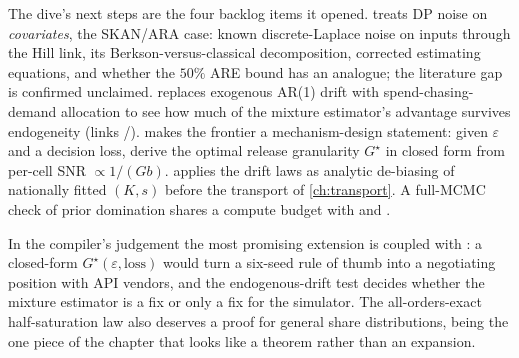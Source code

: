 The dive's next steps are the four backlog items it opened.  treats DP noise on \emph{covariates}, the SKAN/ARA case: known discrete-Laplace noise on inputs through the Hill link, its Berkson-versus-classical decomposition, corrected estimating equations, and whether the $50\%$ ARE bound has an analogue; the literature gap is confirmed unclaimed.  replaces exogenous AR(1) drift with spend-chasing-demand allocation to see how much of the mixture estimator's advantage survives endogeneity (links /).  makes the frontier a mechanism-design statement: given $\varepsilon$ and a decision loss, derive the optimal release granularity $G^\star$ in closed form from per-cell SNR $\propto 1/(Gb)$.  applies the drift laws as analytic de-biasing of nationally fitted $(K,s)$ before the transport of \cref{ch:transport}. A full-MCMC check of prior domination shares a compute budget with  and .

In the compiler's judgement the most promising extension is  coupled with : a closed-form $G^\star(\varepsilon,\text{loss})$ would turn a six-seed rule of thumb into a negotiating position with API vendors, and the endogenous-drift test decides whether the mixture estimator is a fix or only a fix for the simulator. The all-orders-exact half-saturation law also deserves a proof for general share distributions, being the one piece of the chapter that looks like a theorem rather than an expansion.


